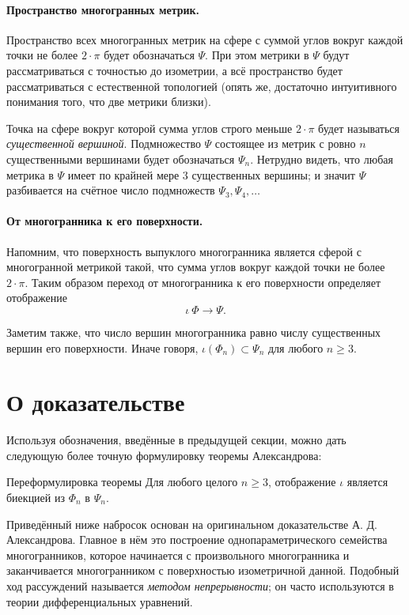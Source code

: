 \documentclass[oneside,a4paper]{article}
\begin{document}
\paragraph{Пространство многогранных метрик.}
Пространство всех многогранных метрик на сфере с суммой углов вокруг каждой точки не более $2\cdot\pi$ будет обозначаться $\Psi$.
При этом метрики в $\Psi$ будут рассматриваться с точностью до изометрии, а всё пространство будет рассматриваться с естественной топологией (опять же, достаточно интуитивного понимания того, что две метрики близки).

Точка на сфере вокруг которой сумма углов строго меньше $2\cdot\pi$ будет называться \emph{существенной вершиной}.
Подмножество $\Psi$ состоящее из метрик с ровно $n$ существенными вершинами будет обозначаться $\Psi_n$.
Нетрудно видеть, что любая метрика в $\Psi$ имеет по крайней мере 3 существенных вершины;
и значит $\Psi$ разбивается на счётное число подмножеств $\Psi_3,\Psi_4,\dots$

\paragraph{От многогранника к его поверхности.}
Напомним, что поверхность выпуклого многогранника является сферой с многогранной метрикой такой, что сумма углов вокруг каждой точки не более $2\cdot\pi$.
Таким образом переход от многогранника к его поверхности определяет отображение 
\[\iota\:\Phi\to \Psi.\]

Заметим также, что число вершин многогранника равно числу существенных вершин его поверхности.
Иначе говоря, $\iota(\Phi_n)\subset \Psi_n$ для любого $n\ge 3$.

\section{О доказательстве}

Используя обозначения, введённые в предыдущей секции, можно дать следующую более точную формулировку теоремы Александрова:

\begin{thm}{Переформулировка теоремы}
Для любого целого $n\ge 3$,
отображение $\iota$ является биекцией из $\Phi_n$ в $\Psi_n$.
\end{thm}

Приведённый ниже набросок основан на оригинальном доказательстве А. Д. Александрова.
Главное в нём это построение однопараметрического семейства многогранников, которое начинается с произвольного многогранника и заканчивается многогранником с поверхностью изометричной данной.  
Подобный ход рассуждений называется \emph{методом непрерывности};
он часто используются в теории дифференциальных уравнений.
\end{document}
